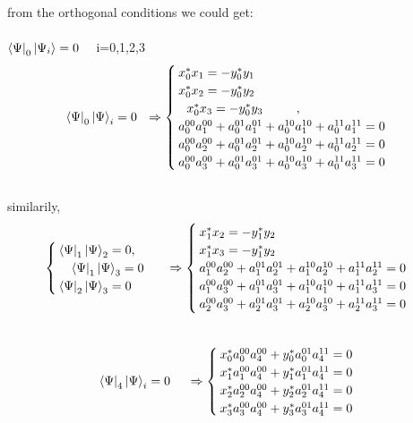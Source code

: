 \documentclass[a4paper,12pt]{article}
\begin{document}
 \leavevmode
\newline 
 from the orthogonal conditions we could get:
\\
\newline \\
$ \bra{\Psi}_{0}\ket{\Psi_{i}}=0 $ \ \ i=0,1,2,3
\begin{equation}
\bra{\Psi}_{0}\ket{\Psi}_{i}=0 \ \ \Rightarrow \begin{cases}
x^{*}_{0}x_{1}=-y^{*}_{0}y_{1} & \\ x^{*}_{0}x_{2}=-y^{*}_{0}y_{2}  \\ \ \ x^{*}_{0}x_{3}=-y^{*}_{0}y_{3}   \ \ \ \ \ \ \ \ ,\\
a_{0}^{00}a_{1}^{00}+a_{0}^{01}a_{1}^{01}+a_{0}^{10}a_{1}^{10}+a_{0}^{11}a_{1}^{11}=0   \\ a_{0}^{00}a_{2}^{00}+a_{0}^{01}a_{2}^{01}+a_{0}^{10}a_{2}^{10}+a_{0}^{11}a_{2}^{11}=0  \\ a_{0}^{00}a_{3}^{00}+a_{0}^{01}a_{3}^{01}+a_{0}^{10}a_{3}^{10}+a_{0}^{11}a_{3}^{11}=0  \\
\end{cases}
\end{equation}
\\
similarily,
\newline \\
\begin{equation}
\begin{cases}
\bra{\Psi}_{1}\ket{\Psi}_{2}=0  ,\\ \ \  \ \bra{\Psi}_{1}\ket{\Psi}_{3}=0 \\  \bra{\Psi}_{2}\ket{\Psi}_{3}=0
\end{cases}
 \ \ \Rightarrow \begin{cases}
x^{*}_{1}x_{2}=-y^{*}_{1}y_{2} & \\ x^{*}_{1}x_{3}=-y^{*}_{1}y_{2}  \\
a_{1}^{00}a_{2}^{00}+a_{1}^{01}a_{2}^{01}+a_{1}^{10}a_{2}^{10}+a_{1}^{11}a_{2}^{11}=0   \\ a_{1}^{00}a_{3}^{00}+a_{1}^{01}a_{3}^{01}+a_{1}^{10}a_{1}^{10}+a_{1}^{11}a_{3}^{11}=0  \\ a_{2}^{00}a_{3}^{00}+a_{2}^{01}a_{3}^{01}+a_{2}^{10}a_{3}^{10}+a_{2}^{11}a_{3}^{11}=0  \\ 

\end{cases}
\end{equation}
\newline \\
\begin{equation}
\bra{\Psi}_{4}\ket{\Psi}_{i}=0   \ \  \ \ \Rightarrow \begin{cases}
x^{*}_{0}a_{0}^{00}a_{4}^{00}+y^{*}_{0}a_{0}^{01}a_{4}^{11}=0\\
x^{*}_{1}a_{1}^{00}a_{4}^{00}+y^{*}_{1}a_{1}^{01}a_{4}^{11}=0 \\
x^{*}_{2}a_{2}^{00}a_{4}^{00}+y^{*}_{2}a_{2}^{01}a_{4}^{11}=0\\
x^{*}_{3}a_{3}^{00}a_{4}^{00}+y^{*}_{3}a_{3}^{01}a_{4}^{11}=0
\end{cases}
\end{equation}
\end{document}
